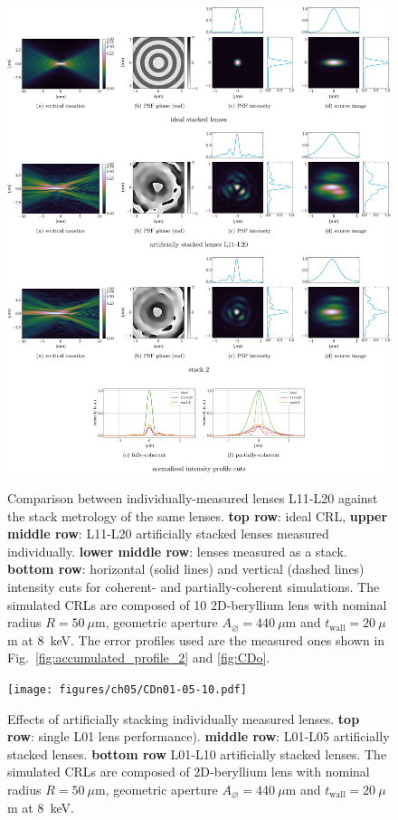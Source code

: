 \begin{refsection}
\begin{figure}[ht]
        \centering
        {\includegraphics[width=1\linewidth]{figures/ch05/CDo_vs_CDoStack.pdf}}
        \caption[Artificially stacked lenses L11-L21 vs. stack 2 comparison]{Comparison between individually-measured lenses L11-L20 against the stack metrology of the same lenses. \textbf{top row}: ideal CRL, \textbf{upper middle row}: L11-L20 artificially stacked lenses measured individually. \textbf{lower middle row}: lenses measured as a stack. \textbf{bottom row}: horizontal (solid lines) and vertical (dashed lines) intensity cuts for coherent- and partially-coherent simulations. The simulated CRLs are composed of 10 2D-beryllium lens with nominal radius $R=50~\mu\text{m}$, geometric aperture $A_{\diameter}=440~\mu\text{m}$ and $t_\text{wall}=20~\mu$m at 8~keV. The error profiles used are the measured ones shown in Fig.~\ref{fig:accumulated_profile_2} and \ref{fig:CDo}.}\label{fig:CDo_vs_CDoStack}
\end{figure}

\begin{figure}[ht]
        \centering
        {\texttt{[image: figures/ch05/CDn01-05-10.pdf]}}
        \caption[Effects of stacking lenses]{Effects of artificially stacking individually measured lenses. \textbf{top row}: single L01 lens performance). \textbf{middle row}: L01-L05 artificially stacked lenses. \textbf{bottom row} L01-L10 artificially stacked lenses. The simulated CRLs are composed of 2D-beryllium lens with nominal radius $R=50~\mu\text{m}$, geometric aperture $A_{\diameter}=440~\mu\text{m}$ and $t_\text{wall}=20~\mu$m at 8~keV.}\label{fig:CDn01-05-10}
\end{figure}


\end{refsection}
